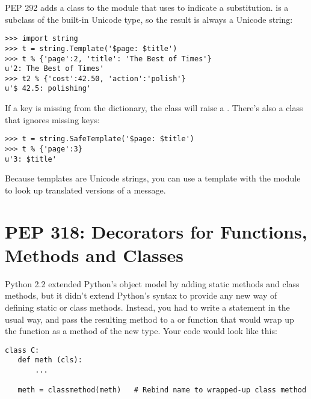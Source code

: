 \documentclass{howto}
\begin{document}
PEP 292 adds a  class to the  module
that uses \samp{\$} to indicate a substitution.   is a
subclass of the built-in Unicode type, so the result is always a
Unicode string:

\begin{verbatim}
>>> import string
>>> t = string.Template('$page: $title')
>>> t % {'page':2, 'title': 'The Best of Times'}
u'2: The Best of Times'
>>> t2 % {'cost':42.50, 'action':'polish'}
u'$ 42.5: polishing'
\end{verbatim}


If a key is missing from the dictionary, the  class 
will raise a .  There's also a 
class that ignores missing keys:

\begin{verbatim}
>>> t = string.SafeTemplate('$page: $title')
>>> t % {'page':3}
u'3: $title'
\end{verbatim}

Because templates are Unicode strings, you can use a template with the
 module to look up translated versions of a message.

\begin{seealso}
\end{seealso}


\section{PEP 318: Decorators for Functions, Methods and Classes}

Python 2.2 extended Python's object model by adding static methods and
class methods, but it didn't extend Python's syntax to provide any new
way of defining static or class methods.  Instead, you had to write a
 statement in the usual way, and pass the resulting
method to a  or 
function that would wrap up the function as a method of the new type.
Your code would look like this:

\begin{verbatim}
class C:
   def meth (cls):
       ...
   
   meth = classmethod(meth)   # Rebind name to wrapped-up class method
\end{verbatim}
\end{document}
